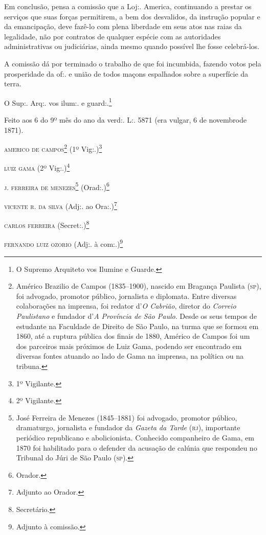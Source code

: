 {Em conclusão, pensa a comissão que a Loj:. America, continuando a
prestar os serviços que suas forças permitirem, a bem dos desvalidos, da
instrução popular e da emancipação, deve fazê-lo com plena liberdade em
seus atos nas raias da legalidade, não por contratos de qualquer espécie
com as autoridades administrativas ou judiciárias, ainda mesmo quando
possível lhe fosse celebrá-los.

A comissão dá por terminado o trabalho de que foi incumbida, fazendo
votos pela prosperidade da of:. e união de todos maçons espalhados sobre
a superfície da terra.

O Sup:. Arq:. vos ilum:. e guard:.\footnote{ O Supremo Arquiteto vos
  Ilumine e Guarde.}

Feito aos 6 do 9º mês do ano da verd:. L:. 5871 (era vulgar, 6 de
novembrode 1871).

\begin{flushright}
\textsc{americo de campos}\footnote{ Américo Brazilio de Campos (1835--1900),
  nascido em Bragança Paulista (\textsc{sp}), foi advogado, promotor público,
  jornalista e diplomata. Entre diversas colaborações na imprensa, foi
  redator d'\emph{O Cabrião}, diretor do \emph{Correio Paulistano} e
  fundador d'\emph{A Província de São Paulo}. Desde os seus tempos de
  estudante na Faculdade de Direito de São Paulo, na turma que se formou
  em 1860, até a ruptura pública dos finais de 1880, Américo de Campos
  foi um dos parceiros mais próximos de Luiz Gama, podendo ser
  encontrado em diversas fontes atuando ao lado de Gama na imprensa, na
  política ou na tribuna.} (1º Vig:.)\footnote{ 1º Vigilante.}

\textsc{luiz gama} (2º Vig:.)\footnote{ 2º Vigilante.}

\textsc{j. ferreira de menezes}\footnote{ José Ferreira de Menezes (1845--1881)
  foi advogado, promotor público, dramaturgo, jornalista e fundador da
  \emph{Gazeta da Tarde} (\textsc{rj}), importante periódico republicano e
  abolicionista. Conhecido companheiro de Gama, em 1870 foi habilitado
  para o defender da acusação de calúnia que respondeu no Tribunal do
  Júri de São Paulo (\textsc{sp}).} (Orad:.)\footnote{ Orador.}

\textsc{vicente r. da silva} (Adj:. ao Ora:.)\footnote{ Adjunto ao Orador.}

\textsc{carlos ferreira} (Secret:.)\footnote{ Secretário.}

\textsc{fernando luiz ozorio} (Adj:. à com:.)\footnote{ Adjunto à comissão.}


\end{flushright}}
